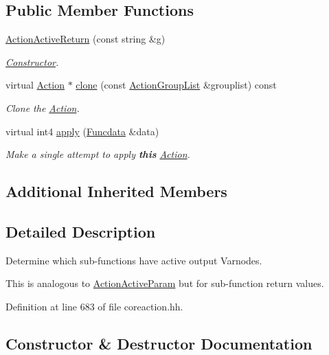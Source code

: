 \subsection*{Public Member Functions}
\begin{DoxyCompactItemize}
\item 
\mbox{\hyperlink{class_action_active_return_a174635bc7c09d57fb7d759b4e57e7dcf}{Action\+Active\+Return}} (const string \&g)
\begin{DoxyCompactList}\small\item\em \mbox{\hyperlink{class_constructor}{Constructor}}. \end{DoxyCompactList}\item 
virtual \mbox{\hyperlink{class_action}{Action}} $\ast$ \mbox{\hyperlink{class_action_active_return_af22b0befcda10abe00618917a557f6c2}{clone}} (const \mbox{\hyperlink{class_action_group_list}{Action\+Group\+List}} \&grouplist) const
\begin{DoxyCompactList}\small\item\em Clone the \mbox{\hyperlink{class_action}{Action}}. \end{DoxyCompactList}\item 
virtual int4 \mbox{\hyperlink{class_action_active_return_a69af2f49b35ac17b7e2cab3e6c0be11b}{apply}} (\mbox{\hyperlink{class_funcdata}{Funcdata}} \&data)
\begin{DoxyCompactList}\small\item\em Make a single attempt to apply {\bfseries{this}} \mbox{\hyperlink{class_action}{Action}}. \end{DoxyCompactList}\end{DoxyCompactItemize}
\subsection*{Additional Inherited Members}


\subsection{Detailed Description}
Determine which sub-\/functions have active output Varnodes. 

This is analogous to \mbox{\hyperlink{class_action_active_param}{Action\+Active\+Param}} but for sub-\/function return values. 

Definition at line 683 of file coreaction.\+hh.



\subsection{Constructor \& Destructor Documentation}
\mbox{\label{class_action_active_return_a174635bc7c09d57fb7d759b4e57e7dcf}} 
